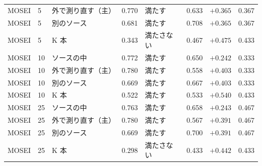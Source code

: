 \begin{longtable}{llp{3.0cm}rlrrr}
MOSEI & 5 & 外で測り直す（主） & 0.770 & 満たす & 0.633 & $+0.365$ & 0.367 \\
MOSEI & 5 & 別のソース & 0.681 & 満たす & 0.708 & $+0.365$ & 0.367 \\
MOSEI & 5 & K 本 & 0.343 & 満たさない & 0.467 & $+0.475$ & 0.433 \\
MOSEI & 10 & ソースの中 & 0.772 & 満たす & 0.650 & $+0.242$ & 0.333 \\
MOSEI & 10 & 外で測り直す（主） & 0.780 & 満たす & 0.558 & $+0.403$ & 0.333 \\
MOSEI & 10 & 別のソース & 0.669 & 満たす & 0.667 & $+0.403$ & 0.333 \\
MOSEI & 10 & K 本 & 0.522 & 満たす & 0.533 & $+0.540$ & 0.433 \\
MOSEI & 25 & ソースの中 & 0.763 & 満たす & 0.658 & $+0.243$ & 0.467 \\
MOSEI & 25 & 外で測り直す（主） & 0.780 & 満たす & 0.567 & $+0.391$ & 0.467 \\
MOSEI & 25 & 別のソース & 0.669 & 満たす & 0.700 & $+0.391$ & 0.467 \\
MOSEI & 25 & K 本 & 0.298 & 満たさない & 0.433 & $+0.442$ & 0.433 \\
\midrule
\end{longtable}
\normalsize
